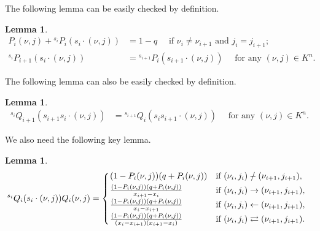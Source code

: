 \documentclass[11pt, reqno]{amsart} \textwidth=14.9cm \oddsidemargin=1cm \evensidemargin=1cm
\newtheorem{lemma}[theorem]{Lemma}
\theoremstyle{definition}
\def\nslash{\:\notslash\:}
\numberwithin{equation}{section}
\begin{document}
The following lemma can be easily checked by definition.
\begin{lemma}
\begin{align} P_{i}(\nu, j)+{}^{s_{i}}P_{i}(s_{i}\cdot(\nu, j))&=1-q \quad\text{ if }\nu_i \neq \nu_{i+1} \text{ and } j_i = j_{i+1};\label{P-relations1}\\[0.2em]
{}^{s_{i}}P_{i+1}(s_{i}\cdot(\nu, j))&={}^{s_{i+1}}P_{i}(s_{i+1}\cdot(\nu, j))\quad\text{ for any }(\nu, j)\in K^{n}. \label{P-relations2}
\end{align}
\end{lemma}
The following lemma can also be easily checked by definition.
\begin{lemma}
\begin{align}
{}^{s_{i}}Q_{i+1}(s_{i+1}s_{i}\cdot(\nu, j))&={}^{s_{i+1}}Q_{i}(s_{i}s_{i+1}\cdot(\nu, j))\quad\text{ for any }(\nu, j)\in K^{n}. \label{Q-relations1}
\end{align}
\end{lemma}
We also need the following key lemma.

\begin{lemma}
\begin{align}
\hspace{-0.1cm}{}^{s_{i}}Q_{i}(s_{i}\cdot(\nu, j))Q_{i}(\nu, j)=\left\{
\begin{array}{ll}
\hspace{-0.15cm}(1-P_{i}(\nu, j))(q+P_{i}(\nu, j))&\text{if $(\nu_i, j_{i})\nslash (\nu_{i+1}, j_{i+1})$},\\[0.3em]
\hspace{-0.15cm}\frac{(1-P_{i}(\nu, j))(q+P_{i}(\nu, j))}{x_{i+1}-x_{i}}&\text{if $(\nu_i, j_{i})\rightarrow (\nu_{i+1}, j_{i+1})$},\\[0.3em]
\hspace{-0.15cm}\frac{(1-P_{i}(\nu, j))(q+P_{i}(\nu, j))}{x_{i}-x_{i+1}}&\text{if $(\nu_i, j_{i})\leftarrow (\nu_{i+1}, j_{i+1})$},\\[0.3em]
\hspace{-0.15cm}\frac{(1-P_{i}(\nu, j))(q+P_{i}(\nu, j))}{(x_{i}-x_{i+1})(x_{i+1}-x_{i})}&\text{if $(\nu_i, j_{i})\rightleftarrows (\nu_{i+1}, j_{i+1})$}.\label{Q-relations2}
\end{array}
\right.\end{align}
\end{lemma}
\end{document}
